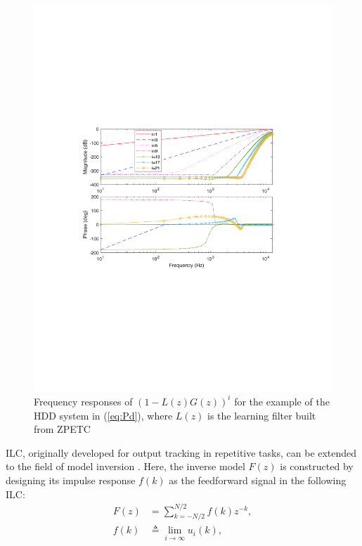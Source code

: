 \documentclass [11pt, proquest] {uwthesis}[2020/02/24]
\begin{document}
\begin{figure}[!ht]
\begin{centering}
\includegraphics[width=13cm]{Model-inversion/ILC_oneminusGGinvi}
\par\end{centering}
\caption{\label{fig:Frequency-responses-of}Frequency responses of $(1-L(z)G(z))^{i}$
for the example of the HDD system in (\ref{eq:Pd}), where $L(z)$
is the learning filter built from ZPETC}
\end{figure}
ILC, originally developed for output tracking in repetitive tasks,
can be extended to the field of model inversion \cite{kim_modelingfree_2013,chen2016data,devasia2017iterative}.
Here, the inverse model $F(z)$ is constructed by designing its impulse
response $f(k)$ as the feedforward signal in the following ILC:
\begin{align}
F(z) & =\sum_{k=-N/2}^{N/2}f(k)z^{-k},\nonumber \\
f(k) & \triangleq\lim_{i\rightarrow\infty}u_{i}(k),\label{eq:fk}
\end{align}
\end{document}

